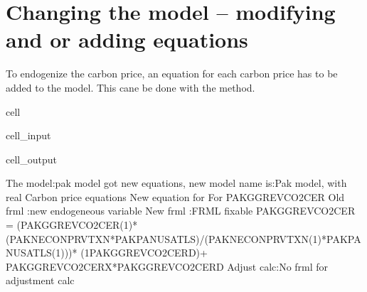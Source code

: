 \documentclass[letterpaper,10pt,english]{jupyterBook}
\begin{document}
\section{Changing the model – modifying and or adding equations}
\label{\detokenize{content/05_WBModels/MoreComplexScenarios:changing-the-model-modifying-and-or-adding-equations}}
\sphinxAtStartPar
To endogenize the carbon price, an equation for each carbon price has to be added to the model.   This cane be done with the  method.

\begin{sphinxuseclass}{cell}\begin{sphinxVerbatimInput}

\begin{sphinxuseclass}{cell_input}
\begin{sphinxVerbatim}[commandchars=\\\{\}]
  
 
\end{sphinxVerbatim}

\end{sphinxuseclass}\end{sphinxVerbatimInput}
\begin{sphinxVerbatimOutput}

\begin{sphinxuseclass}{cell_output}
\begin{sphinxVerbatim}[commandchars=\\\{\}]
The model:\PYGZdq{}pak model\PYGZdq{} got new equations, new model name is:\PYGZdq{}Pak model, with real Carbon price equations\PYGZdq{}
New equation for For PAKGGREVCO2CER
Old frml   :new endogeneous variable 
New frml   :FRML \PYGZlt{}fixable\PYGZgt{} PAKGGREVCO2CER = (PAKGGREVCO2CER(\PYGZhy{}1)*(PAKNECONPRVTXN*PAKPANUSATLS)/(PAKNECONPRVTXN(\PYGZhy{}1)*PAKPANUSATLS(\PYGZhy{}1)))* (1\PYGZhy{}PAKGGREVCO2CER\PYGZus{}D)+ PAKGGREVCO2CER\PYGZus{}X*PAKGGREVCO2CER\PYGZus{}D\PYGZdl{}
Adjust calc:No frml for adjustment calc  


\end{sphinxVerbatim}
\end{sphinxuseclass}
\end{sphinxVerbatimOutput}
\end{sphinxuseclass}
\end{document}

